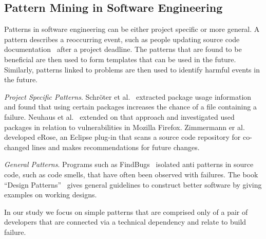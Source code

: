 \documentclass{sig-alternate}
\begin{document}
\subsection{Pattern Mining in Software Engineering}
Patterns in software engineering can be either project specific or more general.
A pattern describes a reoccurring event, such as 
 people updating source code documentation~\cite{schreck:iwpse:2007} after a
 project deadline. The patterns that are found to be beneficial are then used to form templates
 that can be used in the future. Similarly, patterns linked to problems are
 then used to identify harmful events in the future. 
 
 
\emph{Project Specific Patterns}. Schr\"oter et al.~\cite{schroeter:isese:2006}
extracted package usage information and found that using certain packages increases the chance of a file containing a failure. Neuhaus et al.~\cite{neuhaus:ccs:2007} extended on that approach and investigated used packages in relation to vulnerabilities in Mozilla Firefox.
Zimmermann er al.~\cite{zimmermann:oopsla:2005} developed eRose, an Eclipse plug-in that scans a source code repository for co-changed lines and makes recommendations for future changes.

\emph{General Patterns}. Programs such as FindBugs~\cite{cole:oopsla:2006} isolated anti patterns in source code, such as code smells, that have often been observed with failures.
The book ``Design Patterns''~\cite{gamma:1995} gives general guidelines to construct better software by giving examples on working designs.

In our study we focus on simple patterns that are comprised only of a pair of
developers that are connected via a technical dependency and relate to build
failure.
\end{document}

